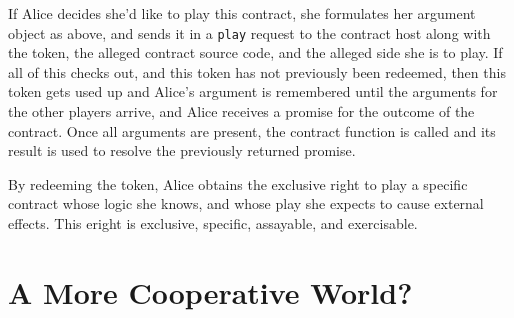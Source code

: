 \documentclass{llncs}
\begin{document}
If Alice decides she'd like to play this contract, she formulates her argument object as above, and sends it in a {\tt play} request to the contract host along with the token, the alleged contract source code, and the alleged side she is to play. If all of this checks out, and this token has not previously been redeemed, then this token gets used up and Alice's argument is remembered until the arguments for the other players arrive, and Alice receives a promise for the outcome of the contract. Once all arguments are present, the contract function is called and its result is used to resolve the previously returned promise.

By redeeming the token, Alice obtains the exclusive right to play a specific contract whose logic she knows, and whose play she expects to cause external effects. This eright is exclusive, specific, assayable, and exercisable. 



\section{A More Cooperative World?}


% 

\end{document}
